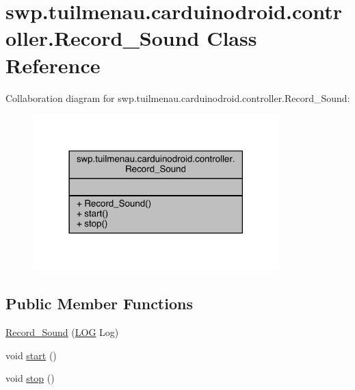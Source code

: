 \hypertarget{classswp_1_1tuilmenau_1_1carduinodroid_1_1controller_1_1_record___sound}{}\section{swp.\+tuilmenau.\+carduinodroid.\+controller.\+Record\+\_\+\+Sound Class Reference}
\label{classswp_1_1tuilmenau_1_1carduinodroid_1_1controller_1_1_record___sound}


Collaboration diagram for swp.\+tuilmenau.\+carduinodroid.\+controller.\+Record\+\_\+\+Sound\+:
\nopagebreak
\begin{figure}[H]
\begin{center}
\leavevmode
\includegraphics[width=270pt]{classswp_1_1tuilmenau_1_1carduinodroid_1_1controller_1_1_record___sound__coll__graph}
\end{center}
\end{figure}
\subsection*{Public Member Functions}
\begin{DoxyCompactItemize}
\item 
\hyperlink{classswp_1_1tuilmenau_1_1carduinodroid_1_1controller_1_1_record___sound_a16a63aa659f4b3263a56850f272597bb}{Record\+\_\+\+Sound} (\hyperlink{classswp_1_1tuilmenau_1_1carduinodroid_1_1model_1_1_l_o_g}{L\+O\+G} Log)
\item 
void \hyperlink{classswp_1_1tuilmenau_1_1carduinodroid_1_1controller_1_1_record___sound_aab8cc754dfbdba7238f09c28cdb561eb}{start} ()
\item 
void \hyperlink{classswp_1_1tuilmenau_1_1carduinodroid_1_1controller_1_1_record___sound_a95cf9a4340f3ca211e2a8dd60f761dcf}{stop} ()
\end{DoxyCompactItemize}


